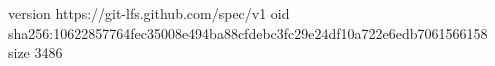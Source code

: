 version https://git-lfs.github.com/spec/v1
oid sha256:10622857764fec35008e494ba88cfdebc3fc29e24df10a722e6edb7061566158
size 3486
